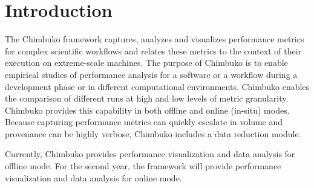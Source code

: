\section{Introduction}
The Chimbuko framework captures, analyzes and visualizes performance metrics for complex scientific workflows and relates these metrics to the context of their execution on extreme-scale machines. The purpose of Chimbuko is to enable empirical studies of performance analysis for a software or a workflow during a development phase or in different computational environments. Chimbuko enables the comparison of different runs at high and low levels of metric granularity. Chimbuko provides this capability in both offline and online (in-situ) modes. Because capturing performance metrics can quickly escalate in volume and provenance can be highly verbose, Chimbuko includes a data reduction module. 

Currently, Chimbuko provides performance visualization and data analysis for offline mode.  For the second year, the framework will provide performance visualization and data analysis for online mode.		
